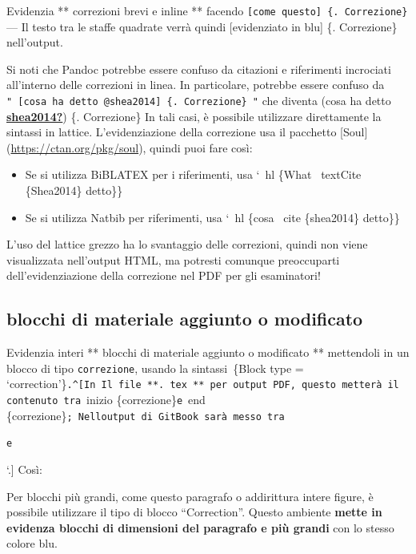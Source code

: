 \documentclass[a4paper, 11pt, nobind]{templates/ociamthesis}
\providecommand{\tightlist}{%
  \setlength{\itemsep}{0pt}\setlength{\parskip}{0pt}}
\begin{document}
Evidenzia ** correzioni brevi e inline ** facendo \texttt{{[}come\ questo{]}\ \{.\ Correzione\}} --- Il testo tra le staffe quadrate verrà quindi {[}evidenziato in blu{]} \{. Correzione\} nell'output.

Si noti che Pandoc potrebbe essere confuso da citazioni e riferimenti incrociati all'interno delle correzioni in linea.
In particolare, potrebbe essere confuso da \texttt{"\ {[}cosa\ ha\ detto\ @shea2014{]}\ \{.\ Correzione\}\ "} che diventa (cosa ha detto \protect\hyperlink{ref-shea2014}{\textbf{shea2014?}}) \{. Correzione\}
In tali casi, è possibile utilizzare direttamente la sintassi in lattice.
L'evidenziazione della correzione usa il pacchetto {[}Soul{]} (\url{https://ctan.org/pkg/soul}), quindi puoi fare così:

\begin{itemize}
\tightlist
\item
  Se si utilizza BiBLATEX per i riferimenti, usa `~hl \{What ~textCite \{Shea2014\} detto\}\}
\item
  Se si utilizza Natbib per riferimenti, usa `~hl \{cosa ~cite \{shea2014\} detto\}\}
\end{itemize}

L'uso del lattice grezzo ha lo svantaggio delle correzioni, quindi non viene visualizzata nell'output HTML, ma potresti comunque preoccuparti dell'evidenziazione della correzione nel PDF per gli esaminatori!

\hypertarget{blocchi-di-materiale-aggiunto-o-modificato}{%
\subsection{blocchi di materiale aggiunto o modificato}\label{blocchi-di-materiale-aggiunto-o-modificato}}

Evidenzia interi ** blocchi di materiale aggiunto o modificato ** mettendoli in un blocco di tipo \texttt{correzione}, usando la sintassi\texttt{\textasciigrave{}\textasciigrave{}\ \textasciigrave{}\textasciigrave{}}\{Block type = `correction'\}\texttt{\textasciigrave{}\textasciigrave{}.\^{}{[}In\ Il\ file\ **.\ tex\ **\ per\ output\ PDF,\ questo\ metterà\ il\ contenuto\ tra}~inizio \{correzione\}\texttt{e}~end \{correzione\}\texttt{;\ Nell\textquotesingle{}output\ di\ GitBook\ sarà\ messo\ tra}

\texttt{e}

`.{]}
Così:

\begin{correction}
Per blocchi più grandi, come questo paragrafo o addirittura intere
figure, è possibile utilizzare il tipo di blocco ``Correction''. Questo
ambiente \textbf{mette in evidenza blocchi di dimensioni del paragrafo e
più grandi} con lo stesso colore blu.
\end{correction}
\end{document}
